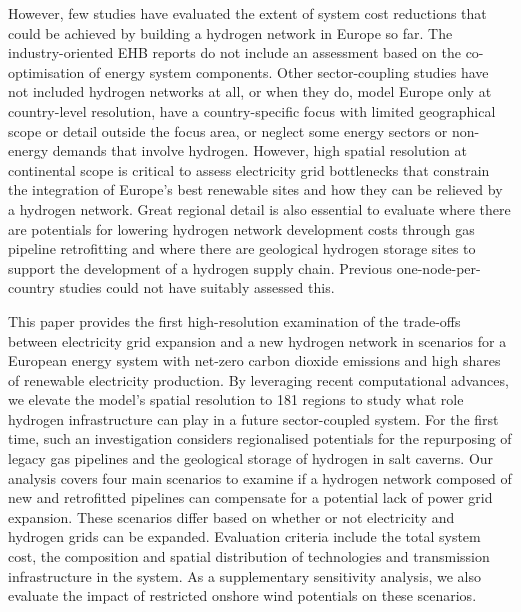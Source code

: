 However, few studies have evaluated the extent of system cost reductions that
could be achieved by building a hydrogen network in Europe so far. The
industry-oriented EHB reports do not include an assessment based on the
co-optimisation of energy system components.
\cite{gasforclimateEuropeanHydrogen2020,gasforclimateEuropeanHydrogen2021,gasforclimateExtendingEuropean2021,gasforclimateEuropeanHydrogen2022}
Other sector-coupling studies have not included hydrogen networks at all,
\cite{brownSynergiesSector2018,pickeringDiversityOptions2022,childFlexibleElectricity2019,kendziorskiCentralizedDecentral2022}
or when they do, model Europe only at country-level resolution,
\cite{europeancommission.directorategeneralforenergy.METISStudy2021,victoriaSpeedTechnological2022}
have a country-specific focus with limited geographical scope or detail outside
the focus area, \cite{gilsInteractionHydrogen2021} or neglect some energy
sectors or non-energy demands that involve hydrogen.
\cite{gilsInteractionHydrogen2021,Caglayan2019,caglayanRobustDesign2021}
However, high spatial resolution at continental scope is critical to assess
electricity grid bottlenecks that constrain the integration of Europe's best
renewable sites and how they can be relieved by a hydrogen network. Great
regional detail is also essential to evaluate where there are potentials for
lowering hydrogen network development costs through gas pipeline retrofitting
and where there are geological hydrogen storage sites to support the development
of a hydrogen supply chain. Previous one-node-per-country studies could not have
suitably assessed this.

This paper provides the first high-resolution examination of the trade-offs
between electricity grid expansion and a new hydrogen network in scenarios for a
European energy system with net-zero carbon dioxide emissions and high shares of
renewable electricity production. By leveraging recent computational advances,
we elevate the model's spatial resolution to 181 regions to study what role
hydrogen infrastructure can play in a future sector-coupled system. For the
first time, such an investigation considers regionalised potentials for the
repurposing of legacy gas pipelines and the geological storage of hydrogen in
salt caverns. Our analysis covers four main scenarios to examine if a hydrogen
network composed of new and retrofitted pipelines can compensate for a potential lack of power grid expansion. These
scenarios differ based on whether or not electricity and hydrogen grids can be
expanded. Evaluation criteria include the total system cost, the composition and
spatial distribution of technologies and transmission infrastructure in the
system. As a supplementary sensitivity analysis, we also evaluate the impact of
restricted onshore wind potentials on these scenarios.

